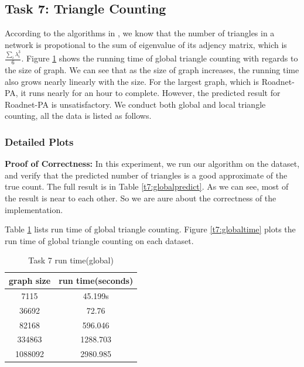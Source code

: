 \subsection{Task 7: Triangle Counting}
According to the algorithms in \cite{tsourakakis2008fast}, we know that the number of triangles in a network is propotional to the sum of eigenvalue of its adjency matrix, which is $\frac{\sum_{i}\lambda_{i}^{3}}{6}$. Figure \ref{t7:timedata} shows the running time of global triangle counting with regards to the size of graph. We can see that as the size of graph increases, the running time also grows nearly linearly with the size. For the largest graph, which is Roadnet-PA, it runs nearly for an hour to complete. However, the predicted result for Roadnet-PA is unsatisfactory. We conduct both global and local triangle counting, all the data is listed as follows.

\subsubsection{Detailed Plots}
{\bf Proof of Correctness: } In this experiment, we run our algorithm on the dataset, and verify that the predicted number of triangles is a good approximate of the true count. The full result is in Table \ref{t7:globalpredict}. As we can see, most of the result is near to each other. So we are aure about the correctness of the implementation. 

Table \ref{t7:timedata} lists run time of global triangle counting. Figure \ref{t7:globaltime} plots the run time of global triangle counting on each dataset.

\begin{table}
\begin{center}
\begin{tabular}{ | c | c | }
    \hline
    graph size & run time(seconds) \\ \hline
    7115 & 45.199s \\ \hline
    36692 & 72.76 \\ \hline
    82168 & 596.046 \\ \hline
    334863 & 1288.703 \\ \hline
    1088092 & 2980.985 \\ \hline
\end{tabular}
\end{center}
\caption{Task 7 run time(global)}
\label{t7:timedata}
\end{table}

